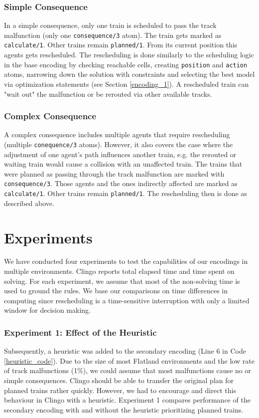 \documentclass[runningheads]{llncs}
\begin{document}
\subsubsection{Simple Consequence}\label{simple_consequence}
In a simple consequence, only one train is scheduled to pass the track malfunction (only one \verb|consequence/3| atom). The train gets marked as \verb|calculate/1|. Other trains remain \verb|planned/1|. From its current position this agents gets rescheduled. The rescheduling is done similarly to the scheduling logic in the base encoding by checking reachable cells, creating \verb|position| and \verb|action| atoms, narrowing down the solution with constraints and selecting the best model via optimization statements (see Section \ref{encoding_1}). A rescheduled train can "wait out" the malfunction or be rerouted via other available tracks.

\subsubsection{Complex Consequence}
A complex consequence includes multiple agents that require rescheduling (multiple \verb|conequence/3| atoms). However, it also covers the case where the adjustment of one agent's path influences another train, e.g. the rerouted or waiting train would cause a collision with an unaffected train. The trains that were planned as passing through the track malfunction are marked with \verb|consequence/3|. Those agents and the ones indirectly affected are marked as \verb|calculate/1|. Other trains remain \verb|planned/1|. The rescheduling then is done as described above.


\section{Experiments}
We have conducted four experiments to test the capabilities of our encodings in multiple environments. Clingo reports total elapsed time and time spent on solving. For each experiment, we assume that most of the non-solving time is used to ground the rules. We base our comparisons on time differences in computing since rescheduling is a  time-sensitive interruption with only a limited window for decision making.

\subsubsection{Experiment 1: Effect of the Heuristic}
Subsequently, a heuristic was added to the secondary encoding (Line 6 in Code \ref{heuristic_code}). Due to the size of most Flatland environments and the low rate of track malfunctions (1\%), we could assume that most malfunctions cause no or simple consequences. Clingo should be able to transfer the original plan for planned trains rather quickly. However, we had to encourage and direct this behaviour in Clingo with a heuristic. Experiment 1 compares performance of the secondary encoding with and without the heuristic prioritizing planned trains.
\end{document}

